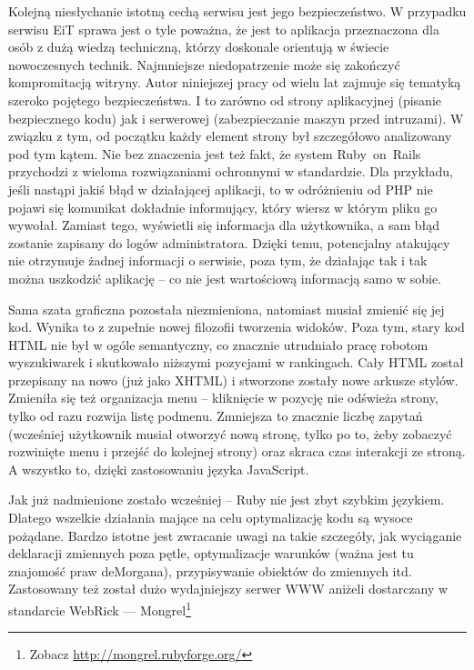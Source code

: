 \documentclass[a4paper,12pt,oneside]{report}
\begin{document}
Kolejną niesłychanie istotną cechą serwisu jest jego bezpieczeństwo. W przypadku serwisu EiT sprawa jest o tyle poważna, że jest to aplikacja przeznaczona dla osób z dużą wiedzą techniczną, którzy doskonale orientują w świecie nowoczesnych technik. Najmniejsze niedopatrzenie może się zakończyć kompromitacją witryny. Autor niniejszej pracy od wielu lat zajmuje się tematyką szeroko pojętego bezpieczeństwa. I to zarówno od strony aplikacyjnej (pisanie bezpiecznego kodu) jak i serwerowej (zabezpieczanie maszyn przed intruzami). W związku z tym, od początku każdy element strony był szczegółowo analizowany pod tym kątem. Nie bez znaczenia jest też fakt, że system Ruby~on~Rails przychodzi z wieloma rozwiązaniami ochronnymi w standardzie. Dla przykładu, jeśli nastąpi jakiś błąd w działającej aplikacji, to w odróżnieniu od PHP nie pojawi się komunikat dokładnie informujący, który wiersz w którym pliku go wywołał. Zamiast tego, wyświetli się informacja dla użytkownika, a sam błąd zostanie zapisany do logów administratora. Dzięki temu, potencjalny atakujący nie otrzymuje żadnej informacji o serwisie, poza tym, że działając tak i tak można uszkodzić aplikację -- co nie jest wartościową informacją samo w sobie.

Sama szata graficzna pozostała niezmieniona, natomiast musiał zmienić się jej kod. Wynika to z zupełnie nowej filozofii tworzenia widoków. Poza tym, stary kod HTML nie był w ogóle semantyczny, co znacznie utrudniało pracę robotom wyszukiwarek i skutkowało niższymi pozycjami w rankingach. Cały HTML został przepisany na nowo (już jako XHTML) i stworzone zostały nowe arkusze stylów. Zmieniła się też organizacja menu -- kliknięcie w pozycję nie odświeża strony, tylko od razu rozwija listę podmenu. Zmniejsza to znacznie liczbę zapytań (wcześniej użytkownik musiał otworzyć nową stronę, tylko po to, żeby zobaczyć rozwinięte menu i przejść do kolejnej strony) oraz skraca czas interakcji ze stroną. A wszystko to, dzięki zastosowaniu języka JavaScript.

Jak już nadmienione zostało wcześniej -- Ruby nie jest zbyt szybkim językiem. Dlatego wszelkie działania mające na celu optymalizację kodu są wysoce pożądane. Bardzo istotne jest zwracanie uwagi na takie szczegóły, jak wyciąganie deklaracji zmiennych poza pętle, optymalizacje warunków (ważna jest tu znajomość praw deMorgana), przypisywanie obiektów do zmiennych itd. Zastosowany też został dużo wydajniejszy serwer WWW aniżeli dostarczany w standarcie WebRick --- Mongrel\footnote{Zobacz \url{http://mongrel.rubyforge.org/}}
\end{document}
